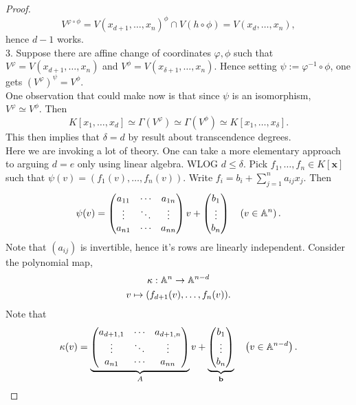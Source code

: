 \begin{proof}
    $$V^{\varphi\circ \phi} = V(x_{d+1},\dots,x_n)^\phi\cap V(h\circ \phi) = V(x_d,\dots,x_n),$$
    hence $d-1$ works.\\
    3. Suppose there are affine change of coordinates $\varphi,\phi$ such that $V^\varphi = V(x_{d+1},\dots,x_n)$ and $V^\phi = V(x_{\delta+1},\dots,x_n)$. Hence setting $\psi:= \varphi^{-1}\circ \phi$, one gets $\left(V^\varphi\right)^\psi = V^\phi$.\\
    One observation that could make now is that since $\psi$ is an isomorphism,\\ $V^\varphi \simeq V^\phi$. Then 
    $$K[x_1,\dots,x_d]\simeq \Gamma\left(V^\varphi\right)\simeq \Gamma\left(V^\phi\right)\simeq K[x_1,\dots,x_\delta].$$
    This then implies that $\delta=d$ by {\LARGE result about transcendence degrees}.\\
    Here we are invoking a lot of theory. One can take a more elementary approach to arguing $d=e$ only using linear algebra. WLOG $ d\leq \delta$. Pick $f_1,\dots,f_n\in K[\mathbf{x}]$ such that $\psi(v)=(f_1(v),\dots,f_n(v))$. Write $f_i=b_i + \sum_{j=1}^n a_{ij}x_j$. Then 
    $$\psi(v) = \begin{pmatrix}
        a_{11}& \cdots & a_{1n}\\
        \vdots & \ddots & \vdots\\
        a_{n1} & \cdots & a_{nn}
    \end{pmatrix}v + \begin{pmatrix}
        b_1 \\ \vdots \\ b_n
    \end{pmatrix} \quad \left(v\in \mathbb{A}^n\right).$$
    Note that $(a_{ij})$ is invertible, hence it's rows are linearly independent. 
    Consider the polynomial map,
    \begin{gather*}
        \kappa: \mathbb{A}^n \rightarrow \mathbb{A}^{n-d}\\
        v\mapsto (f_{d+1}(v),\dots,f_n(v)).
    \end{gather*}
    Note that 
    $$\kappa(v) = \underbrace{\begin{pmatrix}
        a_{d+1,1}& \cdots & a_{d+1,n}\\
        \vdots & \ddots & \vdots\\
        a_{n1} & \cdots & a_{nn}
    \end{pmatrix}}_{A}v + \underbrace{\begin{pmatrix}
        b_1 \\ \vdots \\ b_n \end{pmatrix}}_\mathbf{b} \quad \left(v\in \mathbb{A}^{n-d}\right).$$

\end{proof}
